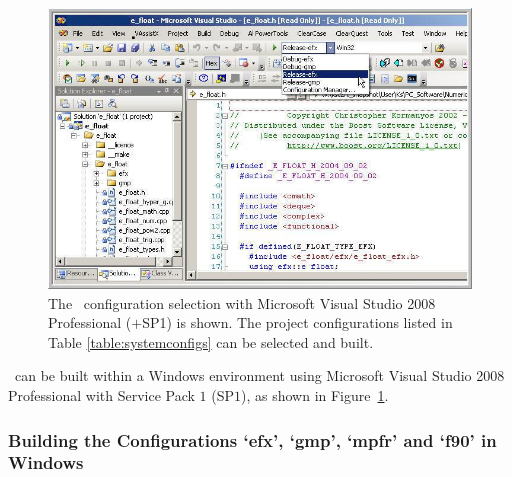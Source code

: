 \begin{figure}[ht]
\centering
\includegraphics[width=16.0cm]{ef_man_Graphic_200_DevStudioConfig.jpg}
\vspace{0.4cm}
\caption{The \efloat\ configuration selection with Microsoft{\footnotesize {\textregistered}}
Visual Studio{\footnotesize {\textregistered}} 2008 Professional ($+$SP1) is shown. The
project configurations listed in Table \ref{table:systemconfigs} can be selected and built.}
\label{fig:devstudioconfig}
\end{figure}

\noindent \efloat\ can be built within a Windows{\footnotesize {\textregistered}} environment
using Microsoft{\footnotesize {\textregistered}} Visual Studio{\footnotesize {\textregistered}}
2008 Professional with Service Pack $1$ (SP$1$), as shown in Figure~\ref{fig:devstudioconfig}.

\subsubsection{Building the Configurations `efx', `gmp', `mpfr' and `f90' in Windows{\footnotesize {\textregistered}}}

